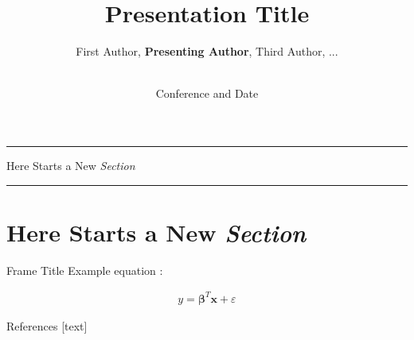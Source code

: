 \documentclass[10pt]{beamer} %
\author{
    First Author,
    \textbf{Presenting Author},
    Third Author, ...}
\title{
    Presentation Title}
\institute{Technical University of Denmark}
\date{\\[\bigskipamount]Conference and Date}
\newcommand{\transframe}[1]{
    \begin{frame}[c]{}
        \begin{center}
        \hrule \vskip 15pt
        \huge #1
        \vskip 15pt \hrule
        \end{center}
    \end{frame}
}
\newcommand{\secframe}[1]{
    \transframe{#1}
    \section{#1}
}
\renewcommand{\vec}[1]{\bm{#1}}
\begin{document}
\begin{frame}[t,plain]
\titlepage
\end{frame}

\secframe{Here Starts a New \emph{Section}}

\begin{frame}[t]{Frame Title}
Example equation \cite{dummycite}:

\begin{align}
    y = \vec{\beta}^T \vec{x} + \varepsilon
\end{align}
\end{frame}

\begin{frame}[t]{References}  %
    [text]
    \renewcommand*{\bibfont}{\small}
    \printbibliography
\end{frame}
\end{document}
